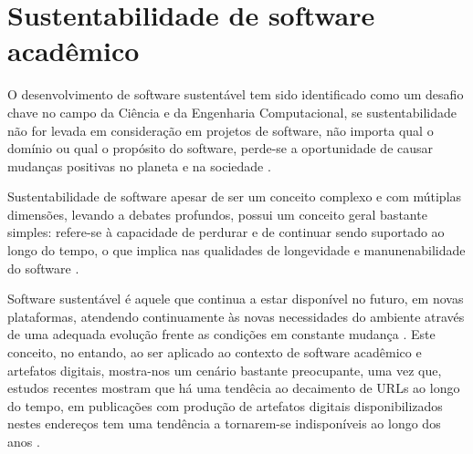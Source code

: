 \section{Sustentabilidade de software acadêmico}

O desenvolvimento de software sustentável tem sido identificado como um desafio
chave no campo da Ciência e da Engenharia Computacional, se sustentabilidade
não for levada em consideração em projetos de software, não importa qual o
domínio ou qual o propósito do software, perde-se a oportunidade de causar
mudanças positivas no planeta e na sociedade \cite{becker2014karlskrona}.

Sustentabilidade de software apesar de ser um conceito complexo e com mútiplas dimensões,
levando a debates profundos, possui um conceito geral bastante simples: refere-se à
capacidade de perdurar e de continuar sendo suportado ao longo do tempo, o que 
implica nas qualidades de longevidade e manunenabilidade do software
\cite{venters2014software}.


Software sustentável é aquele que continua a estar disponível no futuro, em
novas plataformas, atendendo continuamente às novas necessidades do ambiente
através de uma adequada evolução frente as condições em constante mudança
\cite{allen2017engineering}. Este conceito, no entando, ao ser aplicado ao
contexto de software acadêmico e artefatos digitais, mostra-nos um cenário
bastante preocupante, uma vez que, estudos recentes mostram que há uma tendêcia
ao decaimento de URLs ao longo do tempo, em publicações com produção de
artefatos digitais disponibilizados nestes endereços tem uma tendência a
tornarem-se indisponíveis ao longo dos anos \cite{wren2017use}.

